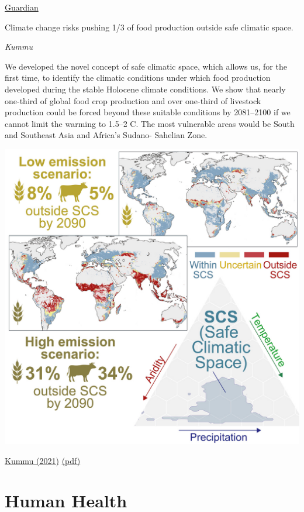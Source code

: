 \documentclass[
]{book}
\begin{document}
\href{https://www.theguardian.com/environment/2021/may/14/third-of-global-food-production-at-risk-from-climate-crisis}{Guardian}

Climate change risks pushing 1/3 of food production outside safe climatic space.

\emph{Kummu}

We developed the novel concept of safe
climatic space, which allows us, for the
first time, to identify the climatic
conditions under which food production
developed during the stable Holocene
climate conditions. We show that nearly
one-third of global food crop production
and over one-third of livestock
production could be forced beyond these
suitable conditions by 2081--2100 if we
cannot limit the warming to 1.5--2 C. The
most vulnerable areas would be South
and Southeast Asia and Africa's Sudano-
Sahelian Zone.

\includegraphics{fig/agricultural_safe_climatic_space.png}

\href{https://www.cell.com/one-earth/fulltext/S2590-3322(21)00236-0}{Kummu (2021)}
\href{pdf/Kummu_2021_Food_outside_Safe_Climatic_Space.pdf}{(pdf)}

\hypertarget{human-health}{%
\chapter{Human Health}\label{human-health}}
\end{document}
